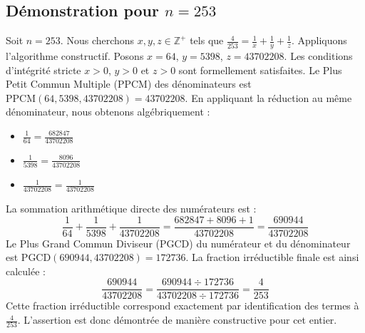 \documentclass[11pt,a4paper]{article}
\begin{document}
\subsection{Démonstration pour $n = 253$}
Soit $n = 253$. Nous cherchons $x, y, z \in \mathbb{Z}^{+}$ tels que $\frac{4}{253} = \frac{1}{x} + \frac{1}{y} + \frac{1}{z}$.
Appliquons l'algorithme constructif. Posons $x = 64$, $y = 5398$, $z = 43702208$.
Les conditions d'intégrité stricte $x > 0$, $y > 0$ et $z > 0$ sont formellement satisfaites.
Le Plus Petit Commun Multiple (PPCM) des dénominateurs est $\text{PPCM}(64, 5398, 43702208) = 43702208$.
En appliquant la réduction au même dénominateur, nous obtenons algébriquement :
\begin{itemize}
    \item $\frac{1}{64} = \frac{682847}{43702208}$
    \item $\frac{1}{5398} = \frac{8096}{43702208}$
    \item $\frac{1}{43702208} = \frac{1}{43702208}$
\end{itemize}
La sommation arithmétique directe des numérateurs est :
$$ \frac{1}{64} + \frac{1}{5398} + \frac{1}{43702208} = \frac{682847 + 8096 + 1}{43702208} = \frac{690944}{43702208} $$
Le Plus Grand Commun Diviseur (PGCD) du numérateur et du dénominateur est $\text{PGCD}(690944, 43702208) = 172736$.
La fraction irréductible finale est ainsi calculée :
$$ \frac{690944}{43702208} = \frac{690944 \div 172736}{43702208 \div 172736} = \frac{4}{253} $$
Cette fraction irréductible correspond exactement par identification des termes à $\frac{4}{253}$. L'assertion est donc démontrée de manière constructive pour cet entier.
\end{document}
